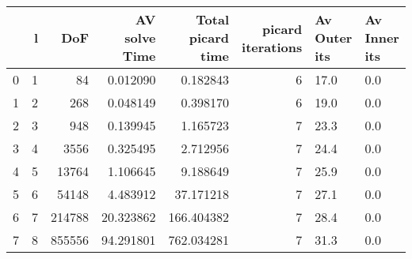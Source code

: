 \begin{tabular}{lrrrrrll}
\toprule
{} &  l &     DoF &  AV solve Time &  Total picard time &  picard iterations & Av Outer its & Av Inner its \\
\midrule
0 &  1 &      84 &       0.012090 &           0.182843 &                  6 &         17.0 &          0.0 \\
1 &  2 &     268 &       0.048149 &           0.398170 &                  6 &         19.0 &          0.0 \\
2 &  3 &     948 &       0.139945 &           1.165723 &                  7 &         23.3 &          0.0 \\
3 &  4 &    3556 &       0.325495 &           2.712956 &                  7 &         24.4 &          0.0 \\
4 &  5 &   13764 &       1.106645 &           9.188649 &                  7 &         25.9 &          0.0 \\
5 &  6 &   54148 &       4.483912 &          37.171218 &                  7 &         27.1 &          0.0 \\
6 &  7 &  214788 &      20.323862 &         166.404382 &                  7 &         28.4 &          0.0 \\
7 &  8 &  855556 &      94.291801 &         762.034281 &                  7 &         31.3 &          0.0 \\
\bottomrule
\end{tabular}
